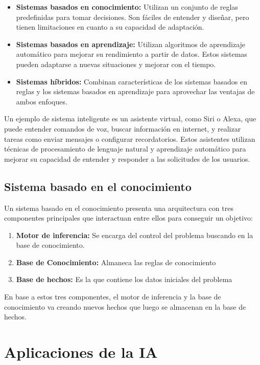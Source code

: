 \begin{itemize}
    \item \textbf{Sistemas basados en conocimiento:} Utilizan un conjunto de reglas predefinidas para tomar decisiones. Son fáciles de entender y diseñar, pero tienen limitaciones en cuanto a su capacidad de adaptación.
    \item \textbf{Sistemas basados en aprendizaje:} Utilizan algoritmos de aprendizaje automático para mejorar su rendimiento a partir de datos. Estos sistemas pueden adaptarse a nuevas situaciones y mejorar con el tiempo.
    \item \textbf{Sistemas híbridos:} Combinan características de los sistemas basados en reglas y los sistemas basados en aprendizaje para aprovechar las ventajas de ambos enfoques.
\end{itemize}

Un ejemplo de sistema inteligente es un asistente virtual, como Siri o Alexa, que puede entender comandos de voz, buscar información en internet, y realizar tareas como enviar mensajes o configurar recordatorios. Estos asistentes utilizan técnicas de procesamiento de lenguaje natural y aprendizaje automático para mejorar su capacidad de entender y responder a las solicitudes de los usuarios.

\subsection{Sistema basado en el conocimiento}
Un sistema basado en el conocimiento presenta una arquitectura con tres componentes principales que interactuan entre ellos para conseguir un objetivo:
\begin{enumerate}
    \item \textbf{Motor de inferencia:} Se encarga del control del problema buscando en la base de conocimiento.
    \item \textbf{Base de Conocimiento:} Almaneca las reglas de conocimiento
    \item \textbf{Base de hechos:} Es la que contiene los datos iniciales del problema
\end{enumerate}

En base a estos tres componentes, el motor de inferencia y la base de conocimiento va creando nuevos hechos que luego se almacenan en la base de hechos.

\section{Aplicaciones de la IA}

